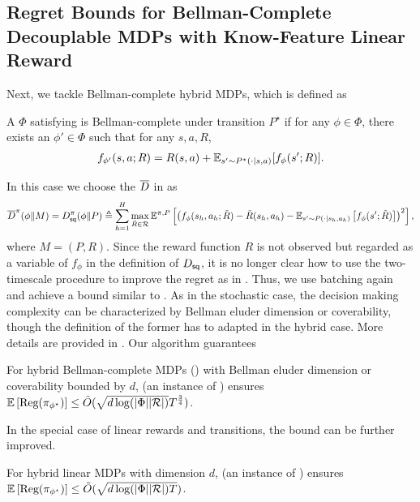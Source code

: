 \subsection{Regret Bounds for Bellman-Complete Decouplable MDPs with Know-Feature Linear Reward}\label{sec: adv BC}
Next, we tackle Bellman-complete hybrid MDPs, which is defined as 
\begin{definition}\label{def: adv bc} A $\Phi$ satisfying  is Bellman-complete under transition $P^\star$ if for any $\phi\in\Phi$, there exists an $\phi'\in\Phi$ such that for any $s,a,R$,  
\begin{align*}
    f_{\phi'}(s,a; R) = R(s,a) + \mathbb{E}_{s'\sim P^\star(\cdot|s,a)}[f_\phi(s'; R)].  
\end{align*}
\end{definition}
In this case we choose the $\overline{D}$ in  as 
\begin{align*}
    \overline{D}^\pi(\phi\|M) = D^\pi_{\mathsf{sq}}(\phi\|P) \triangleq \sum_{h=1}^H \max_{\tilde{R}\in\mathcal{R}}\mathbb{E}^{ \pi, P}\left[\left(f_\phi(s_h, a_h; \tilde{R}) - \tilde{R}(s_h, a_h) - \mathbb{E}_{s' \sim P(\cdot|s_h, a_h)}\left[f_\phi(s';\tilde{R})\right]\right)^2\right], 
\end{align*} 
where $M = (P,R)$. Since the reward function $R$ is not observed but regarded as a variable of $f_{\phi}$ in the definition of $D_{\mathsf{sq}}$, it is no longer clear how to use the two-timescale procedure to improve the regret as in . Thus, we use batching again and achieve a bound similar to . As in the stochastic case, the decision making complexity can be characterized by Bellman eluder dimension or coverability, though the definition of the former has to adapted in the hybrid case. More details are provided in . Our algorithm guarantees 
\begin{theorem}\label{thm: adv bc}
For hybrid Bellman-complete MDPs () with Bellman eluder dimension or coverability bounded by $d$,  (an instance of ) ensures $\mathbb{E}\left[\text{\rm Reg}(\pi_{\phi^\star})\right] \le \tilde{O}(\sqrt{d\log(|\Phi||\mathcal{R}|)}T^{\frac{3}{4}})$.
\label{thm:BC hybrid}
\end{theorem}
In the special case of linear rewards and transitions, the bound can be further improved.
\begin{theorem}\label{thm: adv linear}
For hybrid linear MDPs with dimension $d$,  (an instance of ) ensures $\mathbb{E}\left[\text{\rm Reg}(\pi_{\phi^\star})\right] \le \tilde{O}(\sqrt{d\log(|\Phi||\mathcal{R}|)T})$.
\label{thm:BC hybrid}
\end{theorem}
\fi